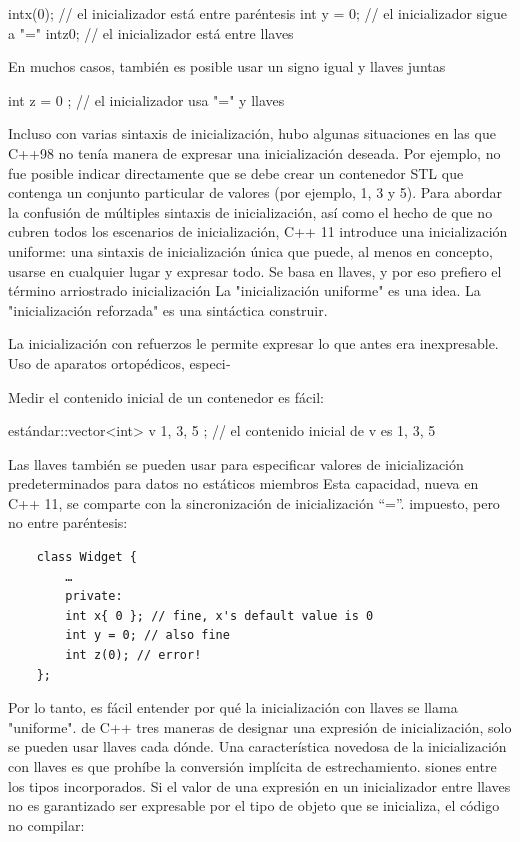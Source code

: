 \documentclass[10pt]{article}
\begin{document}
intx(0); // el inicializador está entre paréntesis
int y = 0; // el inicializador sigue a "="
intz{0}; // el inicializador está entre llaves

En muchos casos, también es posible usar un signo igual y llaves juntas

int z = { 0 }; // el inicializador usa "=" y llaves

Incluso con varias sintaxis de inicialización, hubo algunas situaciones en las que C++98
no tenía manera de expresar una inicialización deseada. Por ejemplo, no fue posible
indicar directamente que se debe crear un contenedor STL que contenga un conjunto particular de
valores (por ejemplo, 1, 3 y 5).
Para abordar la confusión de múltiples sintaxis de inicialización, así como el hecho de que
no cubren todos los escenarios de inicialización, C++ 11 introduce una inicialización uniforme:
una sintaxis de inicialización única que puede, al menos en concepto, usarse en cualquier lugar y
expresar todo. Se basa en llaves, y por eso prefiero el término arriostrado
inicialización La "inicialización uniforme" es una idea. La "inicialización reforzada" es una sintáctica
construir.

La inicialización con refuerzos le permite expresar lo que antes era inexpresable. Uso de aparatos ortopédicos, especi‐

Medir el contenido inicial de un contenedor es fácil:

estándar::vector<int> v{ 1, 3, 5 }; // el contenido inicial de v es 1, 3, 5

Las llaves también se pueden usar para especificar valores de inicialización predeterminados para datos no estáticos
miembros Esta capacidad, nueva en C++ 11, se comparte con la sincronización de inicialización “=”.
impuesto, pero no entre paréntesis:

\begin{verbatim}
	class Widget {
		…
		private:
		int x{ 0 }; // fine, x's default value is 0
		int y = 0; // also fine
		int z(0); // error!
	};
\end{verbatim}

Por lo tanto, es fácil entender por qué la inicialización con llaves se llama "uniforme". de C++
tres maneras de designar una expresión de inicialización, solo se pueden usar llaves cada
dónde.
Una característica novedosa de la inicialización con llaves es que prohíbe la conversión implícita de estrechamiento.
siones entre los tipos incorporados. Si el valor de una expresión en un inicializador entre llaves no es
garantizado ser expresable por el tipo de objeto que se inicializa, el código no
compilar:
\end{document}
